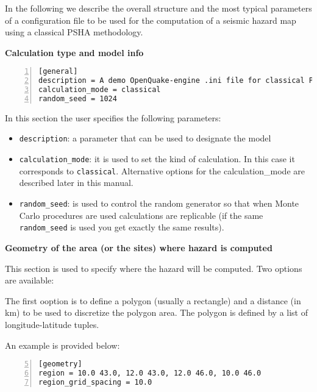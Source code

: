 In the following we describe the overall structure and the most typical
parameters of a configuration file to be used for the computation of a
seismic hazard map using a classical PSHA methodology.


\textbf{Calculation type and model info}

\begin{Verbatim}[frame=single, commandchars=\\\{\}, fontsize=\small,
    numbers=left, numbersep=2pt]
[general]
description = A demo OpenQuake-engine .ini file for classical PSHA
calculation_mode = classical
random_seed = 1024
\end{Verbatim}

In this section the user specifies the following parameters:

\begin{itemize}

    \item \texttt{description}: a parameter that can be used to designate
    the model

    \item \texttt{calculation\_mode}: it is used to set the kind of
    calculation. In this case it corresponds to \texttt{classical}.
    Alternative options for the calculation\_mode are described later in this
    manual.

    \item \texttt{random\_seed}: is used to control the random generator
    so that when Monte Carlo procedures are used calculations are
    replicable (if the same \texttt{random\_seed} is used you get exactly
    the same results).

\end{itemize}

\textbf{Geometry of the area (or the sites) where hazard is computed}

This section is used to specify where the hazard will be computed. Two
options are available:

The first ooption is to define a polygon (usually a rectangle) and a distance
(in km) to be used to discretize the  polygon area. The polygon is defined by
a list of longitude-latitude tuples.

An example is provided below:

\begin{Verbatim}[frame=single, commandchars=\\\{\}, fontsize=\small,
    firstnumber=5, numbers=left, numbersep=2pt]
[geometry]
region = 10.0 43.0, 12.0 43.0, 12.0 46.0, 10.0 46.0
region_grid_spacing = 10.0
\end{Verbatim}

